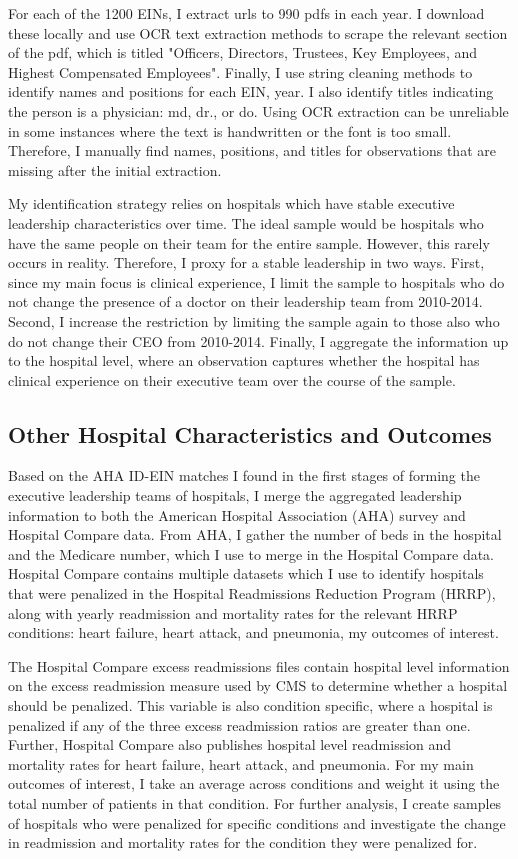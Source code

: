 \documentclass[12pt]{article}
\begin{document}
    For each of the 1200 EINs, I extract urls to 990 pdfs in each year. I download these locally and use OCR text extraction methods to scrape the relevant section of the pdf, which is titled "Officers, Directors, Trustees, Key Employees, and Highest Compensated Employees". Finally, I use string cleaning methods to identify names and positions for each EIN, year. I also identify titles indicating the person is a physician: md, dr., or do. Using OCR extraction can be unreliable in some instances where the text is handwritten or the font is too small. Therefore, I manually find names, positions, and titles for observations that are missing after the initial extraction.

    My identification strategy relies on hospitals which have stable executive leadership characteristics over time. The ideal sample would be hospitals who have the same people on their team for the entire sample. However, this rarely occurs in reality. Therefore, I proxy for a stable leadership in two ways. First, since my main focus is clinical experience, I limit the sample to hospitals who do not change the presence of a doctor on their leadership team from 2010-2014. Second, I increase the restriction by limiting the sample again to those also who do not change their CEO from 2010-2014. Finally, I aggregate the information up to the hospital level, where an observation captures whether the hospital has clinical experience on their executive team over the course of the sample. 


    \subsection{Other Hospital Characteristics and Outcomes}

    Based on the AHA ID-EIN matches I found in the first stages of forming the executive leadership teams of hospitals, I merge the aggregated leadership information to both the American Hospital Association (AHA) survey and Hospital Compare data. From AHA, I gather the number of beds in the hospital and the Medicare number, which I use to merge in the Hospital Compare data. Hospital Compare contains multiple datasets which I use to identify hospitals that were penalized in the Hospital Readmissions Reduction Program (HRRP), along with yearly readmission and mortality rates for the relevant HRRP conditions: heart failure, heart attack, and pneumonia, my outcomes of interest.

    The Hospital Compare excess readmissions files contain hospital level information on the excess readmission measure used by CMS to determine whether a hospital should be penalized. This variable is also condition specific, where a hospital is penalized if any of the three excess readmission ratios are greater than one. Further, Hospital Compare also publishes hospital level readmission and mortality rates for heart failure, heart attack, and pneumonia. For my main outcomes of interest, I take an average across conditions and weight it using the total number of patients in that condition. For further analysis, I create samples of hospitals who were penalized for specific conditions and investigate the change in readmission and mortality rates for the condition they were penalized for. 
\end{document}
